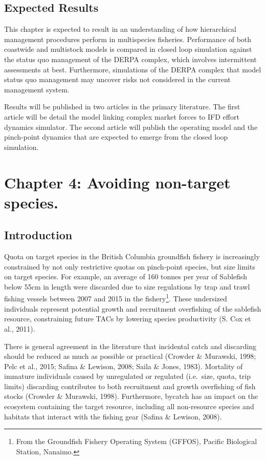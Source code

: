 \documentclass[12pt,]{scrartcl}
\begin{document}
\subsection{Expected Results}\label{expected-results-2}

This chapter is expected to result in an understanding of how
hierarchical management procedures perform in multispecies fisheries.
Performance of both coastwide and multistock models is compared in
closed loop simulation against the status quo management of the DERPA
complex, which involves intermittent assessments at best. Furthermore,
simulations of the DERPA complex that model status quo management may
uncover risks not considered in the current management system.

Results will be published in two articles in the primary literature. The
first article will be detail the model linking complex market forces to
IFD effort dynamics simulator. The second article will publish the
operating model and the pinch-point dynamics that are expected to emerge
from the closed loop simulation.

\section{Chapter 4: Avoiding non-target
species.}\label{chapter-4-avoiding-non-target-species.}

\subsection{Introduction}\label{introduction-1}

Quota on target species in the British Columbia groundfish fishery is
increasingly constrained by not only restrictive quotas on pinch-point
species, but size limits on target species. For example, an average of
160 tonnes per year of Sablefish below 55cm in length were discarded due
to size regulations by trap and trawl fishing vessels between 2007 and
2015 in the fishery\footnote{From the Groundfish Fishery Operating
  System (GFFOS), Pacific Biological Station, Nanaimo.}. These
undersized individuals represent potential growth and recruitment
overfishing of the sablefish resource, constraining future TACs by
lowering species productivity (S. Cox et al., 2011).

There is general agreement in the literature that incidental catch and
discarding should be reduced as much as possible or practical (Crowder
\& Murawski, 1998; Pelc et al., 2015; Safina \& Lewison, 2008; Saila \&
Jones, 1983). Mortality of immature individuals caused by unregulated or
regulated (i.e.~size, quota, trip limits) discarding contributes to both
recruitment and growth overfishing of fish stocks (Crowder \& Murawski,
1998). Furthermore, bycatch has an impact on the ecosystem containing
the target resource, including all non-resource species and habitats
that interact with the fishing gear (Safina \& Lewison, 2008).
\end{document}
